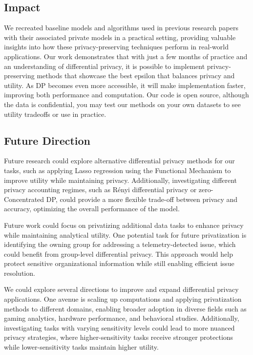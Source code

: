 \documentclass[12pt,letterpaper]{article}
\begin{document}
\subsection{Impact}
We recreated baseline models and algorithms used in previous research papers with their associated private models in a practical setting, providing valuable insights into how these privacy-preserving techniques perform in real-world applications. Our work demonstrates that with just a few months of practice and an understanding of differential privacy, it is possible to implement privacy-preserving methods that showcase the best epsilon that balances privacy and utility. As DP becomes even more accessible, it will make implementation faster, improving both performance and computation. Our code is open source, although the data is confidential, you may test our methods on your own datasets to see utility tradeoffs or use in practice.

\subsection{Future Direction}
Future research could explore alternative differential privacy methods for our tasks, such as applying Lasso regression using the Functional Mechanism to improve utility while maintaining privacy. Additionally, investigating different privacy accounting regimes, such as Rényi differential privacy or zero-Concentrated DP, could provide a more flexible trade-off between privacy and accuracy, optimizing the overall performance of the model. 

Future work could focus on privatizing additional data tasks to enhance privacy while maintaining analytical utility. One potential task for future privatization is identifying the owning group for addressing a telemetry-detected issue, which could benefit from group-level differential privacy. This approach would help protect sensitive organizational information while still enabling efficient issue resolution. 

We could explore several directions to improve and expand differential privacy applications. One avenue is scaling up computations and applying privatization methods to different domains, enabling broader adoption in diverse fields such as gaming analytics, hardware performance, and behavioral studies. Additionally, investigating tasks with varying sensitivity levels could lead to more nuanced privacy strategies, where higher-sensitivity tasks receive stronger protections while lower-sensitivity tasks maintain higher utility.
\end{document}
